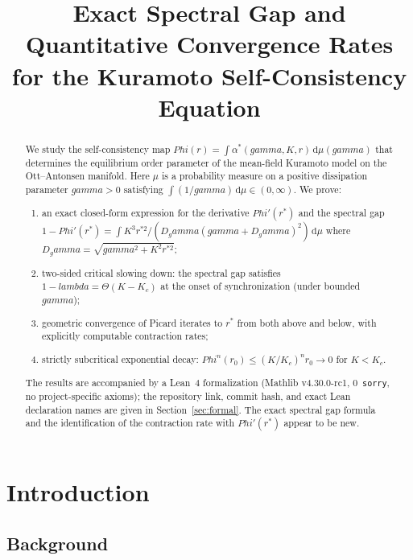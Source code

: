 \documentclass[11pt,a4paper]{article}
\title{Exact Spectral Gap and Quantitative Convergence Rates\\for the Kuramoto Self-Consistency Equation}
\author{}
\date{}
\let\Phi\relax\def\Phi{Phi}%
\let\lambda\relax\def\lambda{lambda}%
\let\gamma\relax\def\gamma{gamma}%
\theoremstyle{definition}
\begin{document}
\maketitle

\begin{abstract}
We study the self-consistency map $\Phi(r) = \int \alpha^*(\gamma, K, r)\,\mathrm{d}\mu(\gamma)$ that determines the equilibrium order parameter of the mean-field Kuramoto model on the Ott--Antonsen manifold. Here $\mu$ is a probability measure on a positive dissipation parameter $\gamma > 0$ satisfying $\int (1/\gamma)\,\mathrm{d}\mu \in (0,\infty)$. We prove:
\begin{enumerate}[label=(\roman*),nosep]
\item an exact closed-form expression for the derivative $\Phi'(r^*)$ and the spectral gap $1 - \Phi'(r^*) = \int K^3 r^{*2} / (D_\gamma ({\gamma + D_\gamma})^2)\,\mathrm{d}\mu$ where $D_\gamma = \sqrt{\gamma^2 + K^2 r^{*2}}$;
\item two-sided critical slowing down: the spectral gap satisfies $1 - \lambda = \Theta(K - K_c)$ at the onset of synchronization (under bounded $\gamma$);
\item geometric convergence of Picard iterates to $r^*$ from both above and below, with explicitly computable contraction rates;
\item strictly subcritical exponential decay: $\Phi^n(r_0) \leq (K/K_c)^n r_0 \to 0$ for $K < K_c$.
\end{enumerate}
The results are accompanied by a Lean~4 formalization (Mathlib v4.30.0-rc1, 0~\texttt{sorry}, no project-specific axioms); the repository link, commit hash, and exact Lean declaration names are given in Section~\ref{sec:formal}. The exact spectral gap formula and the identification of the contraction rate with $\Phi'(r^*)$ appear to be new.
\end{abstract}

\tableofcontents

\section{Introduction}

\subsection{Background}
\end{document}
